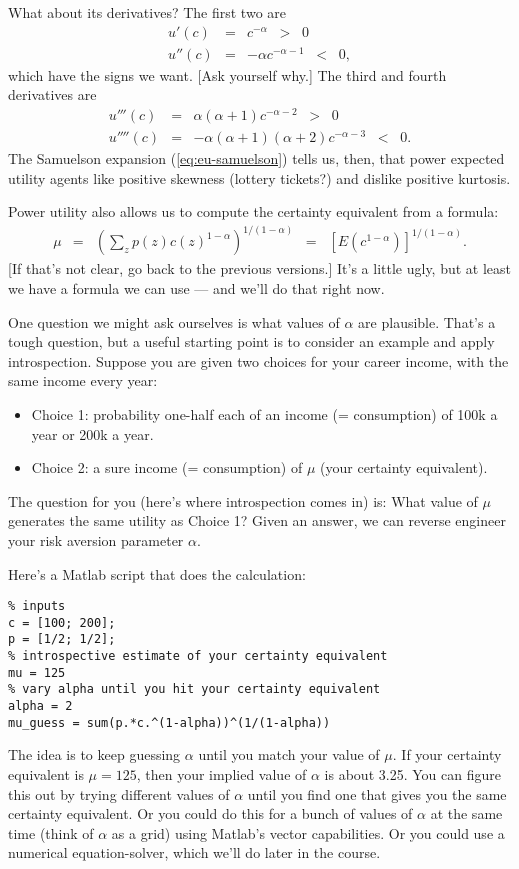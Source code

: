 \documentclass[11pt]{article}
\begin{document}
What about its derivatives?
The first two are
\begin{eqnarray*}
    u'(c)  &=& c^{-\alpha} \;\;>\;\; 0 \\
    u''(c) &=& -\alpha c^{-\alpha-1} \;\;<\;\; 0 ,
\end{eqnarray*}
which have the signs we want.
[Ask yourself why.]
The third and fourth derivatives are
\begin{eqnarray*}
    u'''(c)  &=& \alpha (\alpha+1) c^{-\alpha-2} \;\;>\;\; 0 \\
    u''''(c) &=& - \alpha (\alpha+1) (\alpha+2) c^{-\alpha-3} \;\;<\;\; 0 .
\end{eqnarray*}
The Samuelson expansion (\ref{eq:eu-samuelson}) tells us, then,
that power expected utility agents like positive skewness (lottery tickets?)
and dislike positive kurtosis.


Power utility also allows us to compute the certainty equivalent from a formula:
\begin{eqnarray}
    \mu &=& \left( \sum_z p(z) c(z)^{1-\alpha} \right)^{1/(1-\alpha)}
        \;\;=\;\; \left[ E (c^{1-\alpha}) \right]^{1/(1-\alpha)} .
    \label{eq:certainty-equivalent-power}
\end{eqnarray}
[If that's not clear, go back to the previous versions.]
It's a little ugly, but at least we have a formula we can use ---
and we'll do that right now.


One question we might ask ourselves is what values of $\alpha$ are plausible.
That's a tough question,
but a useful starting point is to consider an example and apply introspection.
Suppose you are given two choices for your career income, with the same
income every year:
\begin{itemize}
\item Choice 1:  probability one-half each of an income (= consumption)
of 100k a year or 200k a year.
\item Choice 2:  a sure income (= consumption) of $\mu$ (your certainty equivalent).
\end{itemize}
The question for you (here's where introspection comes in) is:
What value of $\mu$ generates the same utility as Choice 1?
Given an answer, we can reverse engineer your risk aversion
parameter $\alpha$.

Here's a Matlab script that does the calculation:
\begin{verbatim}
% inputs
c = [100; 200];
p = [1/2; 1/2];
% introspective estimate of your certainty equivalent
mu = 125
% vary alpha until you hit your certainty equivalent
alpha = 2
mu_guess = sum(p.*c.^(1-alpha))^(1/(1-alpha))
\end{verbatim}
The idea is to keep guessing $\alpha$ until you match your value of $\mu$.
If your certainty equivalent is $\mu = 125$, then
your implied value of $\alpha$ is about 3.25.
You can figure this out by trying different values of $\alpha$
until you find one that gives you the same certainty equivalent.
Or you could do this for a bunch of values of $\alpha$ at the same time
(think of $\alpha$ as a grid)
using Matlab's vector capabilities.
Or you could use a numerical equation-solver,
which we'll do later in the course.
\end{document}
